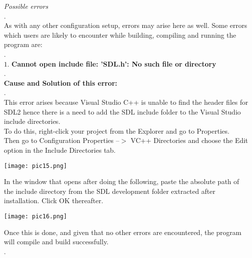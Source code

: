 \documentclass{article}
\begin{document}
\begin{flushleft}
		\textit{Possible errors}\\
		.\\	
		As with any other configuration setup, errors may arise here as well. Some errors which users are likely to encounter while building, compiling and running the program are: \\ .\\
		$ 1. $ 
		\textbf{Cannot open include file: 'SDL.h': No such file or directory}\\
		.\\
		\textbf{Cause and Solution of this error:} \\ .\\
		This error arises because Visual Studio C++ is unable to find the header files for SDL2 hence there is a need to add the SDL include folder to the Visual Studio include directories. \\
		To do this, right-click your project from the Explorer and go to Properties. \\
		Then go to Configuration Properties --$ > $ VC++ Directories and choose the Edit option in the Include Directories tab. \\
		\begin{center}
			\texttt{[image: pic15.png]}
		\end{center}
		In the window that opens after doing the following, paste the absolute path of the include directory from the SDL development folder extracted after installation. Click OK thereafter. \\
		\begin{center}
			\texttt{[image: pic16.png]}
		\end{center}
		Once this is done, and given that no other errors are encountered, the program will compile and build successfully.\\.\\
		

\end{flushleft}
\end{document}
